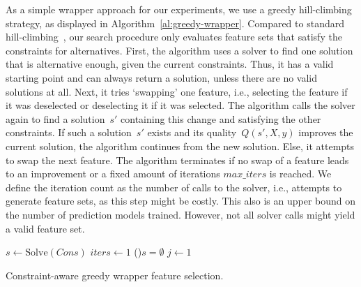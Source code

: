\documentclass{article}
\theoremstyle{definition}
\begin{document}
As a simple wrapper approach for our experiments, we use a greedy hill-climbing strategy, as displayed in Algorithm~\ref{al:greedy-wrapper}.
Compared to standard hill-climbing~\cite{kohavi1997wrappers}, our search procedure only evaluates feature sets that satisfy the constraints for alternatives.
First, the algorithm uses a solver to find one solution that is alternative enough, given the current constraints.
Thus, it has a valid starting point and can always return a solution, unless there are no valid solutions at all.
Next, it tries `swapping' one feature, i.e., selecting the feature if it was deselected or deselecting it if it was selected.
The algorithm calls the solver again to find a solution~$s'$ containing this change and satisfying the other constraints.
If such a solution~$s'$ exists and its quality~$Q(s',X,y)$ improves the current solution, the algorithm continues from the new solution.
Else, it attempts to swap the next feature.
The algorithm terminates if no swap of a feature leads to an improvement or a fixed amount of iterations $max\_iters$ is reached.
We define the iteration count as the number of calls to the solver, i.e., attempts to generate feature sets, as this step might be costly.
This also is an upper bound on the number of prediction models trained.
However, not all solver calls might yield a valid feature set.

\begin{algorithm}[htb]
	\DontPrintSemicolon
	\BlankLine
	$s \leftarrow \text{Solve}(Cons)$ 
	$iters \leftarrow 1$ 
	\If(){$s = \emptyset$}{
		\Return{$\emptyset$}
	}
	$j \leftarrow 1$ 
	\caption{Constraint-aware greedy wrapper feature selection.}
	\label{al:greedy-wrapper}
\end{algorithm}
\end{document}

